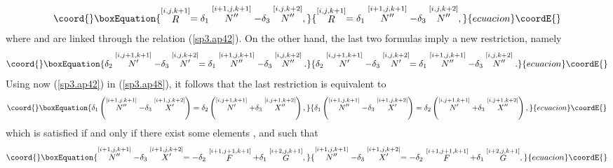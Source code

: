 \documentclass[a4paper,12pt]{article}
\begin{document}
\begin{equation}\coord{}\boxEquation{
\stackrel{\lbrack i,j,k+1]}{R}=\delta _{1}\stackrel{[i+1,j,k+1]}{N^{\prime
\prime }}-\delta _{3}\stackrel{[i,j,k+2]}{N^{\prime \prime }},
\label{sp3.ap47}
}{
\stackrel{\lbrack i,j,k+1]}{R}=\delta _{1}\stackrel{[i+1,j,k+1]}{N^{\prime
\prime }}-\delta _{3}\stackrel{[i,j,k+2]}{N^{\prime \prime }},
}{ecuacion}\coordE{}\end{equation}
where \coordHE{} and \coordHE{} are linked through the relation (\ref{sp3.ap42}). On
the other hand, the last two formulas imply a new restriction, namely 
\begin{equation}\coord{}\boxEquation{
\delta _{2}\stackrel{[i,j+1,k+1]}{N^{\prime }}-\delta _{3}\stackrel{[i,j,k+2]
}{N^{\prime }}=\delta _{1}\stackrel{[i+1,j,k+1]}{N^{\prime \prime }}-\delta
_{3}\stackrel{[i,j,k+2]}{N^{\prime \prime }}.  \label{sp3.ap48}
}{
\delta _{2}\stackrel{[i,j+1,k+1]}{N^{\prime }}-\delta _{3}\stackrel{[i,j,k+2]
}{N^{\prime }}=\delta _{1}\stackrel{[i+1,j,k+1]}{N^{\prime \prime }}-\delta
_{3}\stackrel{[i,j,k+2]}{N^{\prime \prime }}.  }{ecuacion}\coordE{}\end{equation}
Using now (\ref{sp3.ap42}) in (\ref{sp3.ap48}), it follows that the last
restriction is equivalent to 
\begin{equation}\coord{}\boxEquation{
\delta _{1}\left( \stackrel{[i+1,j,k+1]}{N^{\prime \prime }}-\delta _{3}
\stackrel{[i+1,j,k+2]}{X^{\prime }}\right) =\delta _{2}\left( \stackrel{
[i,j+1,k+1]}{N^{\prime }}+\delta _{3}\stackrel{[i,j+1,k+2]}{X^{\prime \prime
}}\right) ,  \label{sp3.ap49}
}{
\delta _{1}\left( \stackrel{[i+1,j,k+1]}{N^{\prime \prime }}-\delta _{3}
\stackrel{[i+1,j,k+2]}{X^{\prime }}\right) =\delta _{2}\left( \stackrel{
[i,j+1,k+1]}{N^{\prime }}+\delta _{3}\stackrel{[i,j+1,k+2]}{X^{\prime \prime
}}\right) ,  }{ecuacion}\coordE{}\end{equation}
which is satisfied if and only if there exist some elements \coordHE{}, \coordHE{} and \coordHE{}
such that 
\begin{equation}\coord{}\boxEquation{
\stackrel{\lbrack i+1,j,k+1]}{N^{\prime \prime }}-\delta _{3}\stackrel{
[i+1,j,k+2]}{X^{\prime }}=-\delta _{2}\stackrel{[i+1,j+1,k+1]}{F}+\delta _{1}
\stackrel{[i+2,j,k+1]}{G},  \label{sp3.ap50}
}{
\stackrel{\lbrack i+1,j,k+1]}{N^{\prime \prime }}-\delta _{3}\stackrel{
[i+1,j,k+2]}{X^{\prime }}=-\delta _{2}\stackrel{[i+1,j+1,k+1]}{F}+\delta _{1}
\stackrel{[i+2,j,k+1]}{G},  }{ecuacion}\coordE{}\end{equation}
\end{document}
